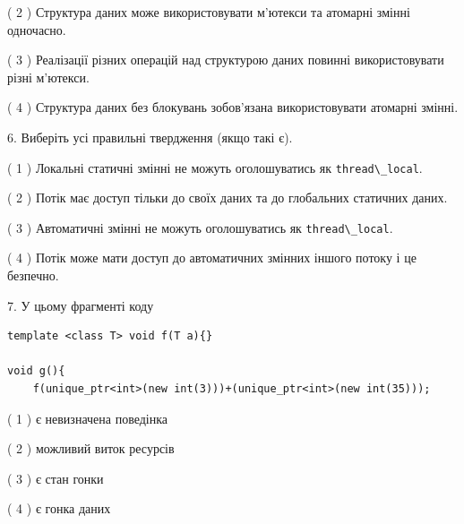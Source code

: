 \documentclass[12pt, ukrainian]{article}
\def\code#1{\Verb!#1!}
\begin{document}
\begin {large}
{( 2 ) Структура даних може використовувати м’ютекси та атомарні змінні одночасно.%

( 3 ) Реалізації різних операцій над структурою даних повинні використовувати різні м’ютекси.%

( 4 ) Структура даних без блокувань зобов’язана використовувати атомарні змінні.%
\newpage



\vspace{5mm}
6. Виберіть усі правильні твердження (якщо такі є).\par
\vspace{2mm}

( 1 ) Локальні статичні змінні не можуть оголошуватись як \code{thread\_local}.%

( 2 ) Потік має доступ тільки до своїх даних та до глобальних статичних даних.%

( 3 ) Автоматичні змінні не можуть оголошуватись як \code{thread\_local}.%

( 4 ) Потік може мати доступ до автоматичних змінних іншого потоку і це безпечно.%


\vspace{5mm}
7. У цьому фрагменті коду
\begin{verbatim}
template <class T> void f(T a){}

void g(){
    f(unique_ptr<int>(new int(3)))+(unique_ptr<int>(new int(35)));
\end{verbatim}

( 1 ) є невизначена поведінка%

( 2 ) можливий виток ресурсів%

( 3 ) є стан гонки%

( 4 ) є гонка даних%
}
\end {large}
\end{document}
